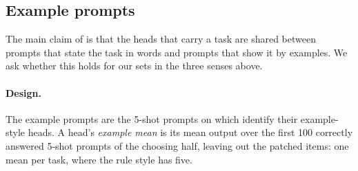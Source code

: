 \documentclass[10pt,a4paper]{article}
\begin{document}
\subsection{Example prompts}\label{sec:styles}

The main claim of \citet{yang2026shared} is that the heads that carry a task are shared between prompts that state the task in words and prompts that show it by examples. We ask whether this holds for our sets in the three senses above.

\paragraph{Design.} The example prompts are the 5-shot prompts on which \citet{yang2026shared} identify their example-style heads. A head's \emph{example mean} is its mean output over the first 100 correctly answered 5-shot prompts of the choosing half, leaving out the patched items: one mean per task, where the rule style has five.
\end{document}
